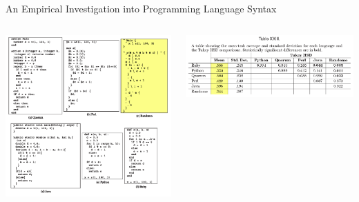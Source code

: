 \documentclass[aspectratio=169]{beamer}
\begin{document}
\begin{frame}{An Empirical Investigation into Programming Language Syntax}
\begin{columns}
\includegraphics[width=\linewidth]{empirical-examples.png}


\vspace{1 cm}
\mbox{\hspace{-1 cm}\includegraphics[width=1.25\linewidth]{empirical-table.png}}
\end{columns}


\end{frame}
\end{document}
